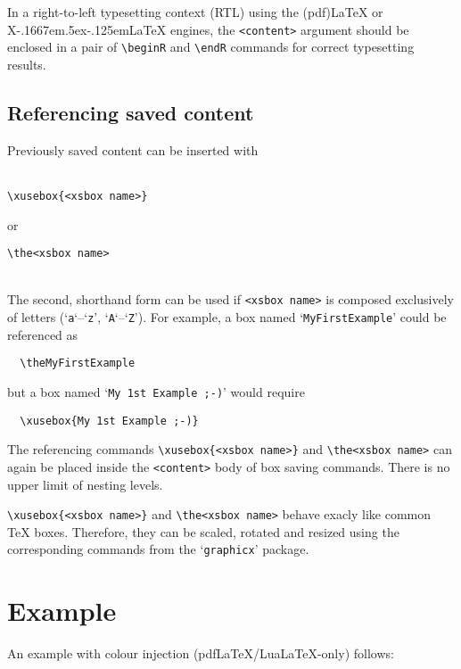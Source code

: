 \documentclass[a4paper]{article}
\def\XeLaTeX{X\kern-.1667em\lower.5ex\hbox{\reflectbox{E}}\kern-.125em\LaTeX}
\begin{document}
In a right-to-left typesetting context (RTL) using the (pdf)\LaTeX{} or \XeLaTeX{} engines, the \verb+<content>+ argument should be enclosed in a pair of \verb+\beginR+ and \verb+\endR+ commands for correct typesetting results.

\subsection*{Referencing saved content}
Previously saved content can be inserted with\\[-1.6\baselineskip]

\hrulefill\\[-1.6\baselineskip]
\begin{Verbatim}
\xusebox{<xsbox name>}
\end{Verbatim}
\vspace{-1ex}
or
\vspace{-1ex}
\begin{Verbatim}
\the<xsbox name>
\end{Verbatim}
\vspace{-1\baselineskip}
\hrulefill\\[-1\baselineskip]

The second, shorthand form can be used if \verb+<xsbox name>+ is composed exclusively of letters (`\verb+a+`--`\verb+z+', `\verb+A+`--`\verb+Z+'). For example, a box named `\verb+MyFirstExample+' could be referenced as
\begin{Verbatim}
  \theMyFirstExample
\end{Verbatim}
but a box named `\verb+My 1st Example ;-)+' would require
\begin{Verbatim}
  \xusebox{My 1st Example ;-)}
\end{Verbatim}

The referencing commands \verb+\xusebox{<xsbox name>}+ and \verb+\the<xsbox name>+ can again be placed inside the \verb+<content>+ body of box saving commands. There is no upper limit of nesting levels.

\verb+\xusebox{<xsbox name>}+ and \verb+\the<xsbox name>+ behave exacly like common \TeX{} boxes. Therefore, they can be scaled, rotated and resized using the corresponding commands from the `\verb+graphicx+' package.

\section{Example}
An example with colour injection (pdf\LaTeX/Lua\LaTeX-only) follows:
\end{document}
